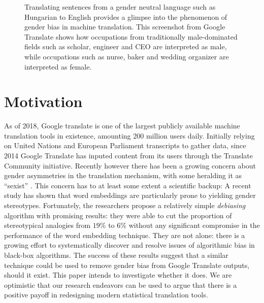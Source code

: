 \documentclass[fleqn,10pt]{article}
\begin{document}
\begin{figure}[h]
	\centering
	\caption{Translating sentences from a gender neutral language such as Hungarian to English provides a glimpse into the phenomenon of gender bias in machine translation. This screenshot from Google Translate shows how occupations from traditionally male-dominated fields\citep{WB2014} such as scholar, engineer and CEO are interpreted as male, while occupations such as nurse, baker and wedding organizer are interpreted as female.}
	\label{fig:screenshot-gtranslate-hungarian}
\end{figure}

\section{Motivation}

As of 2018, Google translate is one of the largest publicly available machine translation tools in existence, amounting 200 million users daily\citep{Gtranslate200daily2017}. Initially relying on United Nations and European Parliament transcripts to gather data, since 2014 Google Translate has inputed content from its users through the Translate Community initiative\citep{TranslateCommunity}. Recently however there has been a growing concern about gender asymmetries in the translation mechanism, with some heralding it as ``sexist'' \citep{AlgorithmGtranslateSexist2018}. This concern has to at least some extent a scientific backup: A recent study has shown that word embeddings are particularly prone to yielding gender stereotypes\citep{bolukbasi2016man}. Fortunately, the researchers propose a relatively simple \emph{debiasing} algorithm with promising results: they were able to cut the proportion of stereotypical analogies from $19\%$ to $6\%$ without any significant compromise in the performance of the word embedding technique. They are not alone: there is a growing effort to systematically discover and resolve issues of algorithmic bias in black-box algorithms\citep{hajian2016algorithmic}. The success of these results suggest that a similar technique could be used to remove gender bias from Google Translate outputs, should it exist. This paper intends to investigate whether it does. We are optimistic that our research endeavors can be used to argue that there is a positive payoff in redesigning modern statistical translation tools.
\end{document}
